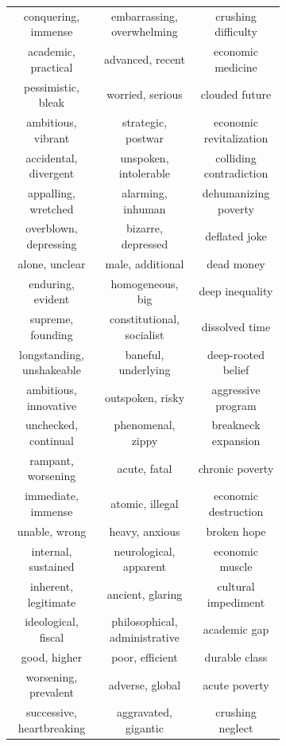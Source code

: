 \documentclass[OpenMind]{stjour}
\begin{document}
\begin{figure}
\begin{subfigure}{0.3\textwidth}
\begin{center}
\begin{tabular}{ c | c | c  }
			\tiny conquering, immense & \tiny embarrassing, overwhelming & \tiny crushing difficulty\\
			\tiny academic, practical & \tiny advanced, recent & \tiny economic medicine\\
			\tiny pessimistic, bleak & \tiny worried, serious & \tiny clouded future\\
			\tiny ambitious, vibrant & \tiny strategic, postwar & \tiny economic revitalization\\
			\tiny accidental, divergent & \tiny unspoken, intolerable & \tiny colliding contradiction\\
			\tiny appalling, wretched & \tiny alarming, inhuman & \tiny dehumanizing poverty\\
			\tiny overblown, depressing & \tiny bizarre, depressed & \tiny deflated joke\\
			\tiny alone, unclear & \tiny male, additional & \tiny dead money\\
			\tiny enduring, evident & \tiny homogeneous, big & \tiny deep inequality\\
			\tiny supreme, founding & \tiny constitutional, socialist & \tiny dissolved time\\
			\tiny longstanding, unshakeable & \tiny baneful, underlying & \tiny deep-rooted belief\\
			\tiny ambitious, innovative & \tiny outspoken, risky & \tiny aggressive program\\
			\tiny unchecked, continual & \tiny phenomenal, zippy & \tiny breakneck expansion\\
			\tiny rampant, worsening & \tiny acute, fatal & \tiny chronic poverty\\
			\tiny immediate, immense & \tiny atomic, illegal & \tiny economic destruction\\
			\tiny unable, wrong & \tiny heavy, anxious & \tiny broken hope\\
			\tiny internal, sustained & \tiny neurological, apparent & \tiny economic muscle\\
			\tiny inherent, legitimate & \tiny ancient, glaring & \tiny cultural impediment\\
			\tiny ideological, fiscal & \tiny philosophical, administrative & \tiny academic gap\\
			\tiny good, higher & \tiny poor, efficient & \tiny durable class\\
			\tiny worsening, prevalent & \tiny adverse, global & \tiny acute poverty\\
			\tiny successive, heartbreaking & \tiny aggravated, gigantic & \tiny crushing neglect\\

\end{tabular}
\end{center}
\end{subfigure}
\end{figure}
\end{document}

